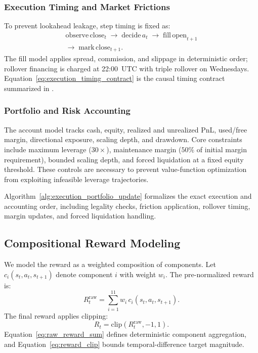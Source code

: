 \subsubsection{Execution Timing and Market Frictions}
To prevent lookahead leakage, step timing is fixed as:
\begin{equation}
\begin{aligned}
\mathrm{observe}\,\mathrm{close}_t \;\rightarrow\; \mathrm{decide}\,a_t \;\rightarrow\; \mathrm{fill}\,\mathrm{open}_{t+1} \\
\rightarrow\; \mathrm{mark}\,\mathrm{close}_{t+1}.
\end{aligned}
\label{eq:execution_timing_contract}
\end{equation}
The fill model applies spread, commission, and slippage in deterministic order; rollover financing is charged at 22:00~UTC with triple rollover on Wednesdays. Equation~\ref{eq:execution_timing_contract} is the causal timing contract summarized in .



\subsubsection{Portfolio and Risk Accounting}
The account model tracks cash, equity, realized and unrealized PnL, used/free margin, directional exposure, scaling depth, and drawdown. Core constraints include maximum leverage ($30\times$), maintenance margin ($50\%$ of initial margin requirement), bounded scaling depth, and forced liquidation at a fixed equity threshold. These controls are necessary to prevent value-function optimization from exploiting infeasible leverage trajectories.

Algorithm~\ref{alg:execution_portfolio_update} formalizes the exact execution and accounting order, including legality checks, friction application, rollover timing, margin updates, and forced liquidation handling.



\subsection{Compositional Reward Modeling}

We model the reward as a weighted composition of components. Let $c_i(s_t, a_t, s_{t+1})$ denote component $i$ with weight $w_i$. The pre-normalized reward is:
\begin{equation}
R_t^{\text{raw}} = \sum_{i=1}^{11} w_i\, c_i(s_t, a_t, s_{t+1}).
\label{eq:raw_reward_sum}
\end{equation}
The final reward applies clipping:
\begin{equation}
R_t = \mathrm{clip}(R_t^{\text{raw}}, -1, 1).
\label{eq:reward_clip}
\end{equation}
Equation~\ref{eq:raw_reward_sum} defines deterministic component aggregation, and Equation~\ref{eq:reward_clip} bounds temporal-difference target magnitude.

